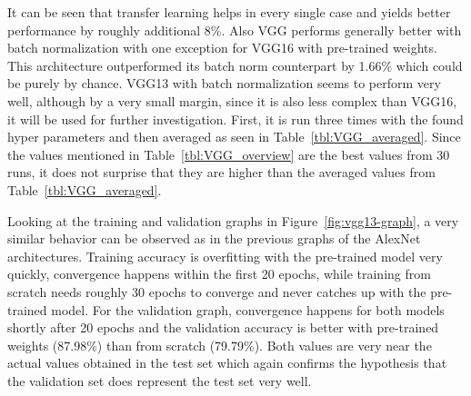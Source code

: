 It can be seen that transfer learning helps in every single case and yields better performance by roughly additional 8\%. Also VGG performs generally better with batch normalization with one exception for VGG16 with pre-trained weights. This architecture outperformed its batch norm counterpart by 1.66\% which could be purely by chance. VGG13 with batch normalization seems to perform very well, although by a very small margin, since it is also less complex than VGG16, it will be used for further investigation. First, it is run three times with the found hyper parameters and then averaged as seen in Table~\ref{tbl:VGG_averaged}. Since the values mentioned in Table~\ref{tbl:VGG_overview} are the best values from 30 runs, it does not surprise that they are higher than the averaged values from Table~\ref{tbl:VGG_averaged}. \\


\begin{table}[!h] \centering
{}
\caption{Running the best VGG architecture three times with the found hyperparameters and averaging across the total of runs. }
\label{tbl:VGG_averaged}
\end{table}

Looking at the training and validation graphs in Figure~\ref{fig:vgg13-graph}, a very similar behavior can be observed as in the previous graphs of the AlexNet architectures. Training accuracy is overfitting with the pre-trained model very quickly, convergence happens within the first 20 epochs, while training from scratch needs roughly 30 epochs to converge and never catches up with the pre-trained model. For the validation graph, convergence happens for both models shortly after 20 epochs and the validation accuracy is better with pre-trained weights (87.98\%) than from scratch (79.79\%). Both values are very near the actual values obtained in the test set which again confirms the hypothesis that the validation set does represent the test set very well. \\


